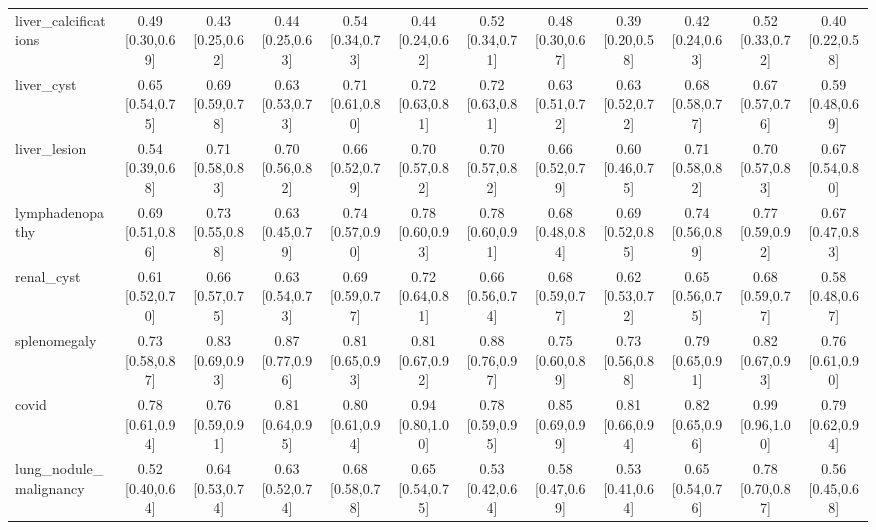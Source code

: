 \begin{tabular}{lccccccccccc}
liver\_calcifications & 0.49 [0.30,0.69] & 0.43 [0.25,0.62] & 0.44 [0.25,0.63] & 0.54 [0.34,0.73] & 0.44 [0.24,0.62] & 0.52 [0.34,0.71] & 0.48 [0.30,0.67] & 0.39 [0.20,0.58] & 0.42 [0.24,0.63] & 0.52 [0.33,0.72] & 0.40 [0.22,0.58] \\
liver\_cyst & 0.65 [0.54,0.75] & 0.69 [0.59,0.78] & 0.63 [0.53,0.73] & 0.71 [0.61,0.80] & 0.72 [0.63,0.81] & 0.72 [0.63,0.81] & 0.63 [0.51,0.72] & 0.63 [0.52,0.72] & 0.68 [0.58,0.77] & 0.67 [0.57,0.76] & 0.59 [0.48,0.69] \\
liver\_lesion & 0.54 [0.39,0.68] & 0.71 [0.58,0.83] & 0.70 [0.56,0.82] & 0.66 [0.52,0.79] & 0.70 [0.57,0.82] & 0.70 [0.57,0.82] & 0.66 [0.52,0.79] & 0.60 [0.46,0.75] & 0.71 [0.58,0.82] & 0.70 [0.57,0.83] & 0.67 [0.54,0.80] \\
lymphadenopathy & 0.69 [0.51,0.86] & 0.73 [0.55,0.88] & 0.63 [0.45,0.79] & 0.74 [0.57,0.90] & 0.78 [0.60,0.93] & 0.78 [0.60,0.91] & 0.68 [0.48,0.84] & 0.69 [0.52,0.85] & 0.74 [0.56,0.89] & 0.77 [0.59,0.92] & 0.67 [0.47,0.83] \\
renal\_cyst & 0.61 [0.52,0.70] & 0.66 [0.57,0.75] & 0.63 [0.54,0.73] & 0.69 [0.59,0.77] & 0.72 [0.64,0.81] & 0.66 [0.56,0.74] & 0.68 [0.59,0.77] & 0.62 [0.53,0.72] & 0.65 [0.56,0.75] & 0.68 [0.59,0.77] & 0.58 [0.48,0.67] \\
splenomegaly & 0.73 [0.58,0.87] & 0.83 [0.69,0.93] & 0.87 [0.77,0.96] & 0.81 [0.65,0.93] & 0.81 [0.67,0.92] & 0.88 [0.76,0.97] & 0.75 [0.60,0.89] & 0.73 [0.56,0.88] & 0.79 [0.65,0.91] & 0.82 [0.67,0.93] & 0.76 [0.61,0.90] \\
covid & 0.78 [0.61,0.94] & 0.76 [0.59,0.91] & 0.81 [0.64,0.95] & 0.80 [0.61,0.94] & 0.94 [0.80,1.00] & 0.78 [0.59,0.95] & 0.85 [0.69,0.99] & 0.81 [0.66,0.94] & 0.82 [0.65,0.96] & 0.99 [0.96,1.00] & 0.79 [0.62,0.94] \\
lung\_nodule\_malignancy & 0.52 [0.40,0.64] & 0.64 [0.53,0.74] & 0.63 [0.52,0.74] & 0.68 [0.58,0.78] & 0.65 [0.54,0.75] & 0.53 [0.42,0.64] & 0.58 [0.47,0.69] & 0.53 [0.41,0.64] & 0.65 [0.54,0.76] & 0.78 [0.70,0.87] & 0.56 [0.45,0.68] \\
\bottomrule
\end{tabular}
